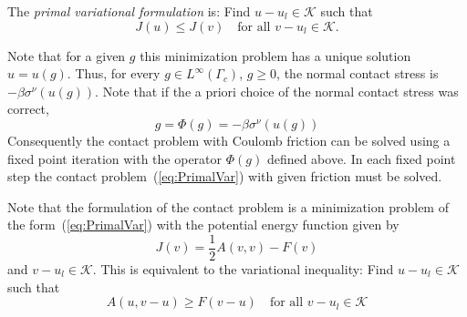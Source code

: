 \documentclass[12pt,a4paper]{article}
\numberwithin{equation}{section}
\numberwithin{table}{section}
\numberwithin{figure}{section}
\newcommand{\half}{\ensuremath{\frac{1}{2}}}
\newcommand{\K}{\ensuremath{\mathcal{K}}}
\renewcommand{\forall}{\text{for all }}
\newcommand{\qforall}{\quad\text{for all }}
\begin{document}
The \emph{primal variational formulation} is: Find $u-u_l\in\K$ such that
\begin{equation}
  \label{eq:PrimalVar}
  J(u) \le J(v) \quad\forall v-u_l\in \K.
\end{equation}

Note that for a given $g$ this minimization problem has a unique solution $u=u(g)$.  Thus,
for every $g\in L^\infty(\Gamma_c)$, $g\ge 0$, the normal contact stress is
$-\beta\sigma^\nu(u(g))$.  Note that if the a priori choice of the normal contact stress
was correct,
\begin{equation}
  \label{eq:12}
  g = \Phi(g) = -\beta\sigma^\nu(u(g))
\end{equation}
Consequently the contact problem with Coulomb friction can be solved using a fixed point
iteration with the operator $\Phi(g)$ defined above.  In each fixed point step the contact
problem~(\ref{eq:PrimalVar}) with given friction must be solved.

Note that the formulation of the contact problem is a minimization problem of the
form~(\ref{eq:PrimalVar}) with the potential energy function given by
\begin{equation}
  \label{eq:PotentialEnergyContact}
  J(v) = \half A(v,v) - F(v)
\end{equation}
and $v-u_l\in\K$.  This is equivalent to the variational inequality:
Find $u-u_l\in\K$ such that
\begin{equation}
  \label{eq:PrimalVarIneq}
  A(u,v-u) \ge F(v-u) \qforall v - u_l\in \K
\end{equation}
\end{document}
